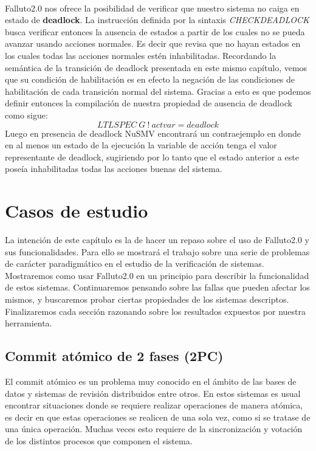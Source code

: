 \documentclass[titlepage, 12pt]{book}
\begin{document}
~\\

Falluto2.0 nos ofrece la posibilidad de verificar que nuestro sistema no caiga en estado de \textbf{deadlock}. La instrucci\'on definida por la sintaxis \textit{CHECKDEADLOCK} busca verificar entonces la ausencia de estados a partir de los cuales no se pueda avanzar usando acciones normales. Es decir que revisa que no hayan estados en los cuales todas las acciones normales est\'en inhabilitadas. Recordando la sem\'antica de la transici\'on de deadlock presentada en este mismo cap\'itulo, vemos que su condici\'on de habilitaci\'on es en efecto la negaci\'on de las condiciones de habilitaci\'on de cada transici\'on normal del sistema. Gracias a esto es que podemos definir entonces la compilaci\'on de nuestra propiedad de ausencia de deadlock como sigue:
$$LTLSPEC~G~!~actvar = deadlock$$
Luego en presencia de deadlock NuSMV encontrar\'a un contraejemplo en donde en al menos un estado de la ejecuci\'on la variable de acci\'on tenga el valor representante de deadlock, sugiriendo por lo tanto que el estado anterior a este pose\'ia inhabilitadas todas las acciones buenas del sistema.





\chapter{Casos de estudio}

La intención de este capítulo es la de hacer un repaso sobre el uso de Falluto2.0 y sus funcionalidades. Para ello se mostrará el trabajo sobre una serie de problemas de carácter paradigmático en el estudio de la verificación de sistemas. Mostraremos como usar Falluto2.0 en un principio para describir la funcionalidad de estos sistemas. Continuaremos pensando sobre las fallas que pueden afectar los mismos, y buscaremos probar ciertas propiedades de los sistemas descriptos. Finalizaremos cada sección razonando sobre los resultados expuestos por nuestra herramienta.

\section{Commit at\'omico de 2 fases (2PC)}

El commit atómico es un problema muy conocido en el ámbito de las bases de datos y sistemas de revisión distribuidos entre otros. En estos sistemas es usual encontrar situaciones donde se requiere realizar operaciones de manera atómica, es decir en que estas operaciones se realicen de una sola vez, como si se tratase de una única operación. Muchas veces esto requiere de la sincronización y votación de los distintos procesos que componen el sistema.\\
\end{document}
